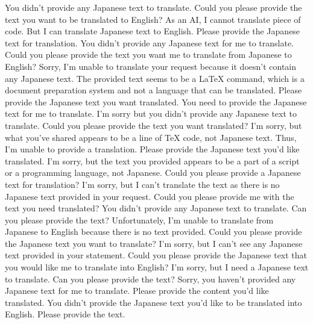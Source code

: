 {%
You didn't provide any Japanese text to translate. Could you please provide the text you want to be translated to English?
As an AI, I cannot translate piece of code. But I can translate Japanese text to English. Please provide the Japanese text for translation.
You didn't provide any Japanese text for me to translate. Could you please provide the text you want me to translate from Japanese to English?
Sorry, I'm unable to translate your request because it doesn't contain any Japanese text. The provided text seems to be a LaTeX command, which is a document preparation system and not a language that can be translated. Please provide the Japanese text you want translated.
You need to provide the Japanese text for me to translate.
I'm sorry but you didn't provide any Japanese text to translate. Could you please provide the text you want translated?
I'm sorry, but what you've shared appears to be a line of TeX code, not Japanese text. Thus, I'm unable to provide a translation. Please provide the Japanese text you'd like translated.
I'm sorry, but the text you provided appears to be a part of a script or a programming language, not Japanese. Could you please provide a Japanese text for translation?
I'm sorry, but I can't translate the text as there is no Japanese text provided in your request. Could you please provide me with the text you need translated?
You didn't provide any Japanese text to translate. Can you please provide the text?
Unfortunately, I'm unable to translate from Japanese to English because there is no text provided. Could you please provide the Japanese text you want to translate?
I'm sorry, but I can't see any Japanese text provided in your statement. Could you please provide the Japanese text that you would like me to translate into English?
I'm sorry, but I need a Japanese text to translate. Can you please provide the text?
Sorry, you haven't provided any Japanese text for me to translate. Please provide the content you'd like translated.
You didn't provide the Japanese text you'd like to be translated into English. Please provide the text.
}
